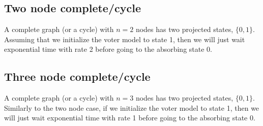 \subsection{Two node complete/cycle}
A complete graph (or a cycle) with $n = 2$ nodes has two projected states, $\{0,1\}$.
Assuming that we initialize the voter model to state 1, then we will just wait exponential time with rate 2 before going to the absorbing state 0.

\subsection{Three node complete/cycle}
A complete graph (or a cycle) with $n = 3$ nodes has two projected states, $\{0,1\}$.
Similarly to the two node case, if we initialize the voter model to state 1, then we will just wait exponential time with rate 1 before going to the absorbing state 0.

